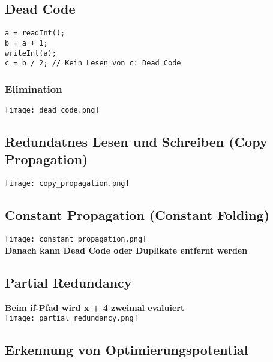 \subsection{Dead Code}
\begin{lstlisting}
a = readInt();
b = a + 1;
writeInt(a);
c = b / 2; // Kein Lesen von c: Dead Code
\end{lstlisting}
\subsubsection{Elimination}
\texttt{[image: dead\_code.png]}

\subsection{Redundatnes Lesen und Schreiben (Copy Propagation)}
\texttt{[image: copy\_propagation.png]}

\subsection{Constant Propagation (Constant Folding)}
\texttt{[image: constant\_propagation.png]}\\
\textbf{Danach kann Dead Code oder Duplikate entfernt werden}

\subsection{Partial Redundancy}
\textbf{Beim if-Pfad wird x + 4 zweimal evaluiert}\\
\texttt{[image: partial\_redundancy.png]}

\subsection{Erkennung von Optimierungspotential}
